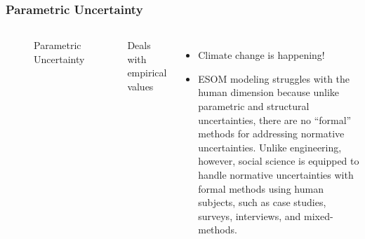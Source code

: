 \begin{frame}
    \frametitle{Parametric Uncertainty}

    \begin{columns}
        \column[t]{5cm}
        \begin{figure}
            \centering
            \resizebox{\columnwidth}{!}{
                
            }
            \caption{Parametric Uncertainty}
            \label{fig:multi-distributions}
        \end{figure}

        \column[t]{5cm}
        Deals with empirical values

        \begin{itemize}
            \item Climate change is happening!
            \item ESOM modeling struggles with the human dimension \cite{pfenninger_energy_2014} because
            unlike parametric and structural uncertainties, there are no ``formal'' methods for addressing
            normative uncertainties. Unlike engineering, however, social science is equipped to handle 
            normative uncertainties with formal methods using human subjects, such as case studies, surveys,
            interviews, and mixed-methods.
        \end{itemize}

        
    \end{columns}

\end{frame}